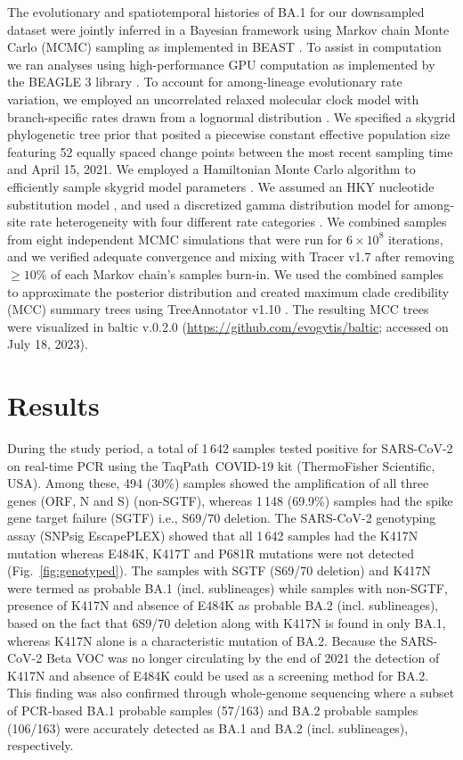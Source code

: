 The evolutionary and spatiotemporal histories of BA.1 for our downsampled dataset were jointly inferred in a Bayesian framework using Markov chain Monte Carlo (MCMC) sampling as implemented in BEAST \cite{suchard2018bayesian}.
To assist in computation we ran analyses using high-performance GPU computation as implemented by the BEAGLE 3 library \cite{baele2019high,ayres2019beagle}.
To account for among-lineage evolutionary rate variation, we employed an uncorrelated relaxed molecular clock model with branch-specific rates drawn from a lognormal distribution \cite{drummond2006relaxed}.
We specified a skygrid phylogenetic tree prior \cite{gill2013improving} that posited a piecewise constant effective population size featuring 52 equally spaced change points between the most recent sampling time and April 15, 2021.
We employed a Hamiltonian Monte Carlo algorithm to efficiently sample skygrid model parameters \cite{baele2020hamiltonian}.
We assumed an HKY nucleotide substitution model \cite{hasegawa1985dating}, and used a discretized gamma distribution model for among-site rate heterogeneity with four different rate categories \cite{yang1994maximum}.
We combined samples from eight independent MCMC simulations that were run for $6\times10^8$ iterations, and we verified adequate convergence and mixing with Tracer v1.7 \cite{rambaut2018posterior} after removing $\geq10\%$ of each Markov chain's samples burn-in.
We used the combined samples to approximate the posterior distribution and created maximum clade credibility (MCC) summary trees using TreeAnnotator v1.10 \cite{suchard2018bayesian}.
The resulting MCC trees were visualized in baltic v.0.2.0 (\url{https://github.com/evogytis/baltic}; accessed on July 18, 2023).


\section{Results}\label{2:sec-res}
During the study period, a total of 1\,642 samples tested positive for SARS-CoV-2 on real-time PCR using the TaqPath\texttrademark\ COVID-19 kit (ThermoFisher Scientific, USA).
Among these, 494 (30\%) samples showed the amplification of all three genes (ORF, N and S) (non-SGTF), whereas 1\,148 (69.9\%) samples had the spike gene target failure (SGTF) i.e., S69/70 deletion.
The SARS-CoV-2 genotyping assay (SNPsig EscapePLEX) showed that all 1\,642 samples had the K417N mutation whereas E484K, K417T and P681R mutations were not detected (Fig.~\ref{fig:genotyped}).
The samples with SGTF (S69/70 deletion) and K417N were termed as probable BA.1 (incl. sublineages) while samples with non-SGTF, presence of K417N and absence of E484K as probable BA.2 (incl. sublineages), based on the fact that 6S9/70 deletion along with K417N is found in only BA.1, whereas K417N alone is a characteristic mutation of BA.2.
Because the SARS-CoV-2 Beta VOC was no longer circulating by the end of 2021 the detection of K417N and absence of E484K could be used as a screening method for BA.2.
This finding was also confirmed through whole-genome sequencing where a subset of PCR-based BA.1 probable samples (57/163) and BA.2 probable samples (106/163) were accurately detected as BA.1 and BA.2 (incl. sublineages), respectively.

